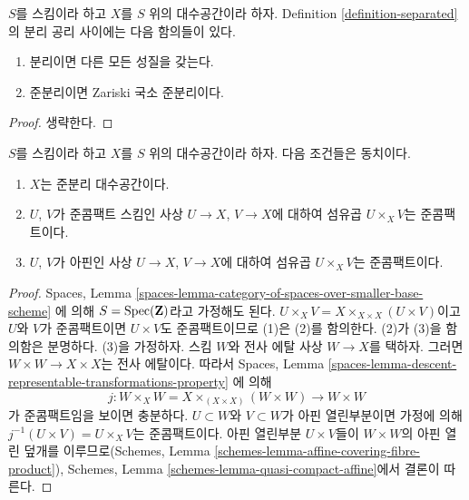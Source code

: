 \begin{lemma}
\label{lemma-trivial-implications}
$S$를 스킴이라 하고 $X$를 $S$ 위의 대수공간이라 하자.
Definition \ref{definition-separated}의 분리 공리 사이에는
다음 함의들이 있다.
\begin{enumerate}
\item 분리이면 다른 모든 성질을 갖는다.
\item 준분리이면 Zariski 국소 준분리이다.
\end{enumerate}
\end{lemma}

\begin{proof}
생략한다.
\end{proof}






\begin{lemma}
\label{lemma-characterize-quasi-separated}
$S$를 스킴이라 하고 $X$를 $S$ 위의 대수공간이라 하자.
다음 조건들은 동치이다.
\begin{enumerate}
\item $X$는 준분리 대수공간이다.
\item $U$, $V$가 준콤팩트 스킴인 사상 $U \to X$, $V \to X$에
대하여 섬유곱 $U \times_X V$는 준콤팩트이다.
\item $U$, $V$가 아핀인 사상 $U \to X$, $V \to X$에
대하여 섬유곱 $U \times_X V$는 준콤팩트이다.
\end{enumerate}
\end{lemma}

\begin{proof}
Spaces, Lemma
\ref{spaces-lemma-category-of-spaces-over-smaller-base-scheme}
에 의해 $S = \mathop{\mathrm{Spec}}(\mathbf{Z})$라고 가정해도 된다.
$U \times_X V = X \times_{X \times X} (U \times V)$이고
$U$와 $V$가 준콤팩트이면 $U \times V$도 준콤팩트이므로
(1)은 (2)를 함의한다. (2)가 (3)을 함의함은 분명하다.
(3)을 가정하자. 스킴 $W$와 전사 에탈 사상 $W \to X$를
택하자. 그러면 $W \times W \to X \times X$는 전사 에탈이다.
따라서 Spaces, Lemma
\ref{spaces-lemma-descent-representable-transformations-property}
에 의해
$$
j : W \times_X W = X \times_{(X \times X)} (W \times W) \to W \times W
$$
가 준콤팩트임을 보이면 충분하다.
$U \subset W$와 $V \subset W$가 아핀 열린부분이면
가정에 의해 $j^{-1}(U \times V) = U \times_X V$는
준콤팩트이다. 아핀 열린부분 $U \times V$들이 $W \times W$의
아핀 열린 덮개를 이루므로(Schemes, Lemma
\ref{schemes-lemma-affine-covering-fibre-product}),
Schemes, Lemma
\ref{schemes-lemma-quasi-compact-affine}에서 결론이 따른다.
\end{proof}

